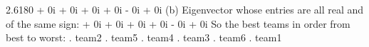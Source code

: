 \documentclass[12pt]{report}
\begin{document}
2.6180 + 0i
 + 0i
 + 0i
 + 0i
 - 0i
 + 0i
\newline
\newline
(b) Eigenvector whose entries are all real and of the same sign: 
 + 0i
 + 0i
 + 0i
 + 0i
 - 0i
 + 0i
\newline
\newline
So the best teams in order from best to worst:
. team2
. team5
. team4
. team3
. team6
. team1
\end{document}
